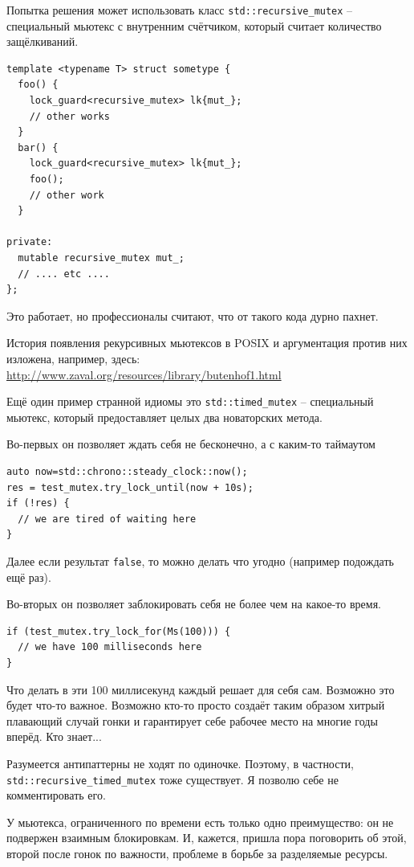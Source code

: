 \documentclass[a4paper,12pt,oneside]{book}
\begin{document}
Попытка решения может использовать класс \lstinline!std::recursive_mutex! -- специальный мьютекс с внутренним счётчиком, который считает количество защёлкиваний.

\begin{lstlisting}
template <typename T> struct sometype {
  foo() { 
    lock_guard<recursive_mutex> lk{mut_};
    // other works
  }
  bar() { 
    lock_guard<recursive_mutex> lk{mut_};
    foo();
    // other work
  }

private:
  mutable recursive_mutex mut_;
  // .... etc ....
};
\end{lstlisting}

Это работает, но профессионалы считают, что от такого кода дурно пахнет.

История появления рекурсивных мьютексов в POSIX и аргументация против них изложена, например, здесь: \url{http://www.zaval.org/resources/library/butenhof1.html}

Ещё один пример странной идиомы это \lstinline!std::timed_mutex! -- специальный мьютекс, который предоставляет целых два новаторских метода. 

Во-первых он позволяет ждать себя не бесконечно, а с каким-то таймаутом  

\begin{lstlisting}
auto now=std::chrono::steady_clock::now();
res = test_mutex.try_lock_until(now + 10s);
if (!res) {
  // we are tired of waiting here
}
\end{lstlisting}

Далее если результат \lstinline!false!, то можно делать что угодно (например подождать ещё раз).

Во-вторых он позволяет заблокировать себя не более чем на какое-то время.

\begin{lstlisting}
if (test_mutex.try_lock_for(Ms(100))) {
  // we have 100 milliseconds here
}
\end{lstlisting}

Что делать в эти 100 миллисекунд каждый решает для себя сам. Возможно это будет что-то важное. Возможно кто-то просто создаёт таким образом хитрый плавающий случай гонки и гарантирует себе рабочее место на многие годы вперёд. Кто знает...

Разумеется антипаттерны не ходят по одиночке. Поэтому, в частности, \lstinline!std::recursive_timed_mutex! тоже существует. Я позволю себе не комментировать его.

У мьютекса, ограниченного по времени есть только одно преимущество: он не подвержен взаимным блокировкам. И, кажется, пришла пора поговорить об этой, второй после гонок по важности, проблеме в борьбе за разделяемые ресурсы.
\end{document}
